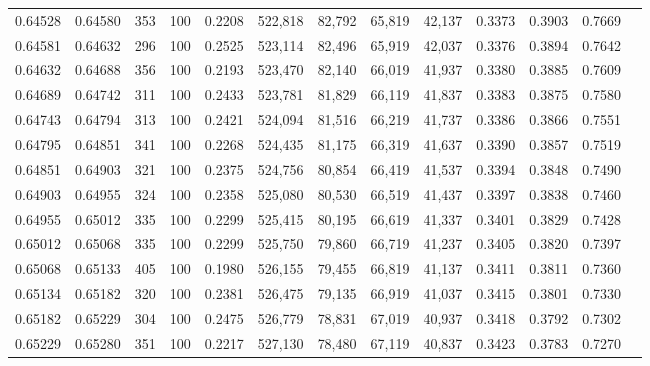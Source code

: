 \begin{tabular}{rrrrrrrrrrrrr}
0.64528 & 0.64580 &   353 & 100 &                                     0.2208 & 522,818 &  82,792 &  65,819 &  42,137 & 0.3373 & 0.3903 & 0.7669 \\
0.64581 & 0.64632 &   296 & 100 &                                     0.2525 & 523,114 &  82,496 &  65,919 &  42,037 & 0.3376 & 0.3894 & 0.7642 \\
0.64632 & 0.64688 &   356 & 100 &                                     0.2193 & 523,470 &  82,140 &  66,019 &  41,937 & 0.3380 & 0.3885 & 0.7609 \\
0.64689 & 0.64742 &   311 & 100 &                                     0.2433 & 523,781 &  81,829 &  66,119 &  41,837 & 0.3383 & 0.3875 & 0.7580 \\
0.64743 & 0.64794 &   313 & 100 &                                     0.2421 & 524,094 &  81,516 &  66,219 &  41,737 & 0.3386 & 0.3866 & 0.7551 \\
0.64795 & 0.64851 &   341 & 100 &                                     0.2268 & 524,435 &  81,175 &  66,319 &  41,637 & 0.3390 & 0.3857 & 0.7519 \\
0.64851 & 0.64903 &   321 & 100 &                                     0.2375 & 524,756 &  80,854 &  66,419 &  41,537 & 0.3394 & 0.3848 & 0.7490 \\
0.64903 & 0.64955 &   324 & 100 &                                     0.2358 & 525,080 &  80,530 &  66,519 &  41,437 & 0.3397 & 0.3838 & 0.7460 \\
0.64955 & 0.65012 &   335 & 100 &                                     0.2299 & 525,415 &  80,195 &  66,619 &  41,337 & 0.3401 & 0.3829 & 0.7428 \\
0.65012 & 0.65068 &   335 & 100 &                                     0.2299 & 525,750 &  79,860 &  66,719 &  41,237 & 0.3405 & 0.3820 & 0.7397 \\
0.65068 & 0.65133 &   405 & 100 &                                     0.1980 & 526,155 &  79,455 &  66,819 &  41,137 & 0.3411 & 0.3811 & 0.7360 \\
0.65134 & 0.65182 &   320 & 100 &                                     0.2381 & 526,475 &  79,135 &  66,919 &  41,037 & 0.3415 & 0.3801 & 0.7330 \\
0.65182 & 0.65229 &   304 & 100 &                                     0.2475 & 526,779 &  78,831 &  67,019 &  40,937 & 0.3418 & 0.3792 & 0.7302 \\
0.65229 & 0.65280 &   351 & 100 &                                     0.2217 & 527,130 &  78,480 &  67,119 &  40,837 & 0.3423 & 0.3783 & 0.7270 \\

\end{tabular}

